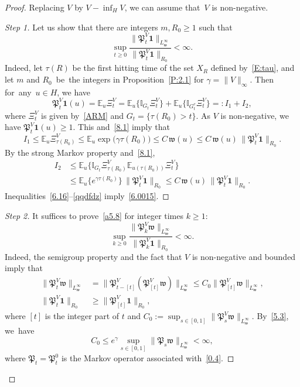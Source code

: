 \documentclass[AHL,Unicode,longabstracts]{cedram}
\newcommand{\mek}{{\mathbf 1}}
\newcommand{\I}{{\mathbb I}}
\newcommand{\E}{{\mathbb E}}
\newcommand{\ty}{\infty}
\newcommand{\wwww}{{\mathfrak w}}
\newcommand{\PPPP}{{\mathfrak P}}
\newenvironment{step}{\begin{proof}}{\let\qed\relax \end{proof}}
\begin{document}
\begin{proof}
Replacing $V$ by $V-\inf_HV$, we can assume that~$V$ is non-negative.

\begin{step}[Step 1]
Let us show that there are integers $m, R_0\ge1$ such that
\begin{equation}\label{6.0015}
\sup_{t\ge0} \frac{\|\PPPP_{t}^V{\mek}\|_{L_\wwww^\infty}}{\|\PPPP_{t}^V{\mek}\|_{R_0}}<\infty.
\end{equation}
Indeed, let $\tau(R)$ be the first hitting time of the set $X_R$ defined by~\eqref{E:tau}, and let $m$ and $R_0$~be~the integers in Proposition~\ref{P:2.1} for $\gamma=\|V\|_\ty$. Then for~any~$u\in H$, we have
\begin{equation}
\PPPP_t^V{\mek}(u)=\E_u\Xi^V_t =\E_u \bigl\{\I_{G_t}\Xi^V_t \bigr\}+\E_u\bigl\{\I_{G_t^c}\Xi^V_t\bigr\}=:I_1+I_2,\label{6.16}
\end{equation}
where $\Xi^V_t$ is given by~\eqref{ARM} and $G_t=\{\tau(R_0)> t\}$. As $V$ is non-negative, we have $\PPPP_t^V{\mek}(u)\ge1$. This and~\eqref{8.1} imply that
\begin{equation}\label{sdqsd}
I_1\le \E_u \Xi^V_{\tau(R_0)} \le \E_u\exp\bigl(\gamma\tau(R_0)\bigr)\le C\,\wwww(u)
\le C\,\wwww(u)\,\|\PPPP_t^V{\mek}\|_{R_0}.
\end{equation}
By the strong Markov property and~\eqref{8.1},
\begin{align}
I_2&\le \E_u\bigl\{\I_{G_t}\Xi^V_{\tau(R_0)}\E_{u(\tau(R_0))}\Xi^V_t\bigr\}
\nonumber\\&\le\E_u \{e^{\gamma\tau(R_0)} \}\,\|\PPPP_t^V{\mek}\|_{R_0} \le C\,\wwww(u)\,\|\PPPP_t^V{\mek}\|_{R_0}.\label{qqdfdz}
\end{align}
Inequalities~\eqref{6.16}--\eqref{qqdfdz} imply~\eqref{6.0015}.
\end{step}

\begin{step}[Step 2]
It suffices to prove~\eqref{a5.8} for integer times $k\ge1$:
\begin{equation}
\sup_{k\ge0}
\frac{\|\PPPP_k^V\wwww\|_{L_{\wwww}^\infty}}{\|\PPPP_k^V{\mek}\|_{R_0}}<\infty.\label{a5.8b}
\end{equation}
Indeed, the semigroup property and the fact that $V$ is non-negative and bounded imply that
\begin{align*}
\|\PPPP^V_t\wwww\|_{L_\wwww^\infty} &=\|\PPPP^V_{t-[t]}(\PPPP^V_{[t]}\wwww)\|_{L_\wwww^\infty} \le C_0\|\PPPP^V_{[t] }\wwww\|_{L_\wwww^\infty},\\
\|\PPPP_t^V{\mek}\|_{R_0}&\ge\|\PPPP_{[t]}^V{\mek}\|_{R_0},
\end{align*}
where $[t]$ is the integer part of $t$ and $ C_0:=\sup_{s\in[0,1]}\|\PPPP^V_s\wwww\|_{L_\wwww^\infty}.$ By~\eqref{5.3}, we~have
\[
C_0 \le e^{\gamma} \sup_{s\in[0,1]}\|\PPPP_s\wwww\|_{L_\wwww^\infty}<\ty,
\]
where $\PPPP_t=\PPPP_t^0$ is the Markov operator associated with~\eqref{0.4}.
\end{step}


\end{proof}
\end{document}
